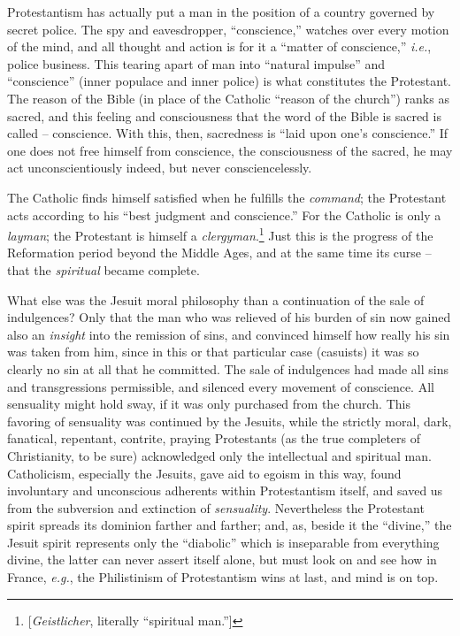 Protestantism has actually put a man in the position of a country governed by 
secret police. The spy and eavesdropper, ``conscience,'' watches over every 
motion of the mind, and all thought and action is for it a ``matter of 
conscience,'' \textit{i.e.}, police business. This tearing apart of man into 
``natural impulse'' and ``conscience'' (inner populace and inner police) 
is what constitutes the Protestant. The reason of the Bible (in place of the 
Catholic ``reason of the church'') ranks as sacred, and this feeling and 
consciousness that the word of the Bible is sacred is called -- conscience. 
With this, then, sacredness is ``laid upon one's conscience.'' If one does 
not free himself from conscience, the consciousness of the sacred, he may act 
unconscientiously indeed, but never consciencelessly.

The Catholic finds himself satisfied when he fulfills the \textit{command}; 
the Protestant acts according to his ``best judgment and conscience.'' For 
the Catholic is only a \textit{layman}; the Protestant is himself a 
\textit{clergyman}.\footnote{[\textit{Geistlicher}, literally ``spiritual 
man.'']} Just this is the progress of the Reformation period beyond the 
Middle Ages, and at the same time its curse -- that the \textit{spiritual} 
became complete.

What else was the Jesuit moral philosophy than a continuation of the sale of 
indulgences? Only that the man who was relieved of his burden of sin now 
gained also an \textit{insight} into the remission of sins, and convinced 
himself how really his sin was taken from him, since in this or that 
particular case (casuists) it was so clearly no sin at all that he committed. 
The sale of indulgences had made all sins and transgressions permissible, and 
silenced every movement of conscience. All sensuality might hold sway, if it 
was only purchased from the church. This favoring of sensuality was continued 
by the Jesuits, while the strictly moral, dark, fanatical, repentant, 
contrite, praying Protestants (as the true completers of Christianity, to be 
sure) acknowledged only the intellectual and spiritual man. Catholicism, 
especially the Jesuits, gave aid to egoism in this way, found involuntary and 
unconscious adherents within Protestantism itself, and saved us from the 
subversion and extinction of \textit{sensuality}. Nevertheless the Protestant 
spirit spreads its dominion farther and farther; and, as, beside it the 
``divine,'' the Jesuit spirit represents only the ``diabolic'' which is 
inseparable from everything divine, the latter can never assert itself alone, 
but must look on and see how in France, \textit{e.g.}, the Philistinism of 
Protestantism wins at last, and mind is on top.

